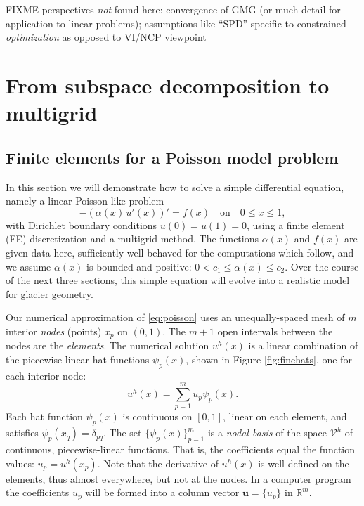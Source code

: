 \documentclass[letterpaper,final,12pt,reqno]{amsart}
\theoremstyle{claim}
\newcommand{\RR}{\mathbb{R}}
\newcommand{\bu}{\mathbf{u}}
\numberwithin{equation}{section}
\numberwithin{figure}{section}
\numberwithin{table}{section}
\begin{document}
FIXME perspectives \emph{not} found here: convergence of GMG (or much detail for application to linear problems); assumptions like ``SPD'' specific to constrained \emph{optimization} as opposed to VI/NCP viewpoint


\section{From subspace decomposition to multigrid} \label{sec:subspace}

\subsection*{Finite elements for a Poisson model problem}  In this section we will demonstrate how to solve a simple differential equation, namely a linear Poisson-like problem
\begin{equation}
- (\alpha(x)\,u'(x))' = f(x) \quad \text{on} \quad 0 \le x \le 1, \label{eq:poisson}
\end{equation}
with Dirichlet boundary conditions $u(0)=u(1)=0$, using a finite element (FE) discretization and a multigrid method.  The functions $\alpha(x)$ and $f(x)$ are given data here, sufficiently well-behaved for the computations which follow, and we assume $\alpha(x)$ is bounded and positive: $0 < c_1 \le \alpha(x) \le c_2$.  Over the course of the next three sections, this simple equation will evolve into a realistic model for glacier geometry.

Our numerical approximation of \eqref{eq:poisson} uses an unequally-spaced mesh of $m$ interior \emph{nodes} (points) $x_p$ on $(0,1)$.  The $m+1$ open intervals between the nodes are the \emph{elements}.  The numerical solution $u^h(x)$ is a linear combination of the piecewise-linear hat functions $\psi_p(x)$, shown in Figure \ref{fig:finehats}, one for each interior node:
\begin{equation}
u^h(x) = \sum_{p=1}^m u_p \psi_p(x). \label{eq:trialsolution}
\end{equation}
Each hat function $\psi_p(x)$ is continuous on $[0,1]$, linear on each element, and satisfies $\psi_p(x_q) = \delta_{pq}$.  The set $\{\psi_p(x)\}_{p=1}^m$ is a \emph{nodal basis} of the space $\mathcal{V}^h$ of continuous, piecewise-linear functions.  That is, the coefficients equal the function values: $u_p=u^h(x_p)$.  Note that the derivative of $u^h(x)$ is well-defined on the elements, thus almost everywhere, but not at the nodes.  In a computer program the coefficients $u_p$ will be formed into a column vector $\bu=\{u_p\}$ in $\RR^m$.
\end{document}
